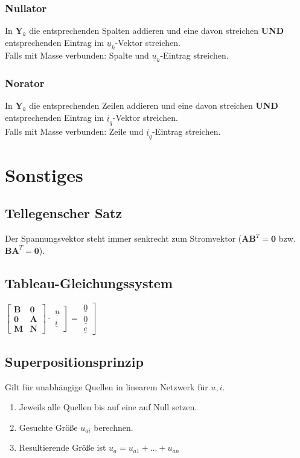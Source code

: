 \documentclass[a4paper,twocolumn,10pt]{article}
\begin{document}
\subsubsection*{Nullator}
In $\textbf{Y}_k$ die entsprechenden Spalten addieren und eine davon streichen \textbf{UND} entsprechenden Eintrag im $\underline{u}_k$-Vektor streichen.\\
Falls mit Masse verbunden: Spalte und $\underline{u}_k$-Eintrag streichen.
\subsubsection*{Norator}
In $\textbf{Y}_k$ die entsprechenden Zeilen addieren und eine davon streichen \textbf{UND} entsprechenden Eintrag im $\underline{i}_q$-Vektor streichen.\\
Falls mit Masse verbunden: Zeile und $\underline{i}_q$-Eintrag streichen.

\section*{Sonstiges}
\subsection*{Tellegenscher Satz}
Der Spannungsvektor steht immer senkrecht zum Stromvektor ($\textbf{A}\textbf{B}^T=\textbf{0}$ bzw. $\textbf{B}\textbf{A}^T=\textbf{0}$).

\subsection*{Tableau-Gleichungssystem}
$\begin{bmatrix}\textbf{B} & \textbf{0} \\ \textbf{0} & \textbf{A} \\ \textbf{M} & \textbf{N}\end{bmatrix}\cdot \left.\begin{matrix}\underline{u}\\\underline{i}\end{matrix}\right]=\left.\begin{matrix}\underline{0}\\ \underline{0} \\ \underline{e}\end{matrix}\right]$

\subsection*{Superpositionsprinzip}
Gilt für unabhängige Quellen in linearem Netzwerk für $u,i$.
\begin{enumerate}
	\item Jeweils alle Quellen bis auf eine auf Null setzen.
	\item Gesuchte Größe $u_{ai}$ berechnen.
	\item Resultierende Größe ist $u_a=u_{a1}+...+u_{an}$
	
\end{enumerate}
\end{document}
